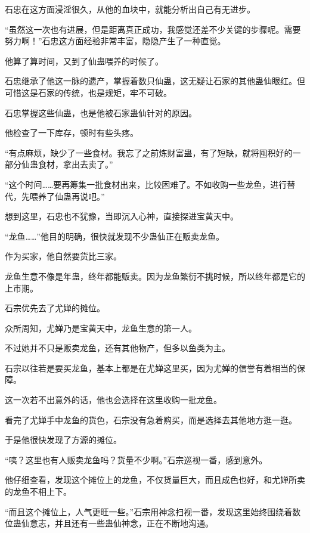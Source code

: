 
\begin{this_body}



石忠在这方面浸淫很久，从他的血块中，就能分析出自己有无进步。

“虽然这一次也有进展，但是距离真正成功，我感觉还差不少关键的步骤呢。需要努力啊！”石忠这方面经验非常丰富，隐隐产生了一种直觉。

他算了算时间，又到了仙蛊喂养的时候了。

石忠继承了他这一脉的遗产，掌握着数只仙蛊，这无疑让石家的其他蛊仙眼红。但可惜这是石家的传统，也是规矩，牢不可破。

石忠掌握这些仙蛊，也是他被石家蛊仙针对的原因。

他检查了一下库存，顿时有些头疼。

“有点麻烦，缺少了一些食材。我忘了之前炼财富蛊，有了短缺，就将囤积好的一部分仙蛊食材，拿出去卖了。”

“这个时间……要再筹集一批食材出来，比较困难了。不如收购一些龙鱼，进行替代，先喂养了仙蛊再说吧。”

想到这里，石忠也不犹豫，当即沉入心神，直接探进宝黄天中。

“龙鱼……”他目的明确，很快就发现不少蛊仙正在贩卖龙鱼。

作为买家，他自然要货比三家。

龙鱼生意不像是年蛊，终年都能贩卖。因为龙鱼繁衍不挑时候，所以终年都是它的上市期。

石宗优先去了尤婵的摊位。

众所周知，尤婵乃是宝黄天中，龙鱼生意的第一人。

不过她并不只是贩卖龙鱼，还有其他物产，但多以鱼类为主。

石宗以往若是要买龙鱼，基本上都是在尤婵这里买，因为尤婵的信誉有着相当的保障。

这一次若不出意外的话，他也会选择在这里收购一批龙鱼。

看完了尤婵手中龙鱼的货色，石宗没有急着购买，而是选择去其他地方逛一逛。

于是他很快发现了方源的摊位。

“咦？这里也有人贩卖龙鱼吗？货量不少啊。”石宗巡视一番，感到意外。

他仔细查看，发现这个摊位上的龙鱼，不仅货量巨大，而且成色也好，和尤婵所卖的龙鱼不相上下。

“而且这个摊位上，人气更旺一些。”石宗用神念扫视一番，发现这里始终围绕着数位蛊仙意志，并且还有一些蛊仙神念，正在不断地沟通。


\end{this_body}
